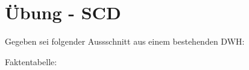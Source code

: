 \section{Übung - SCD}
\label{sec:uebung_04}
Gegeben sei folgender Aussschnitt aus einem bestehenden DWH:

Faktentabelle:



%

